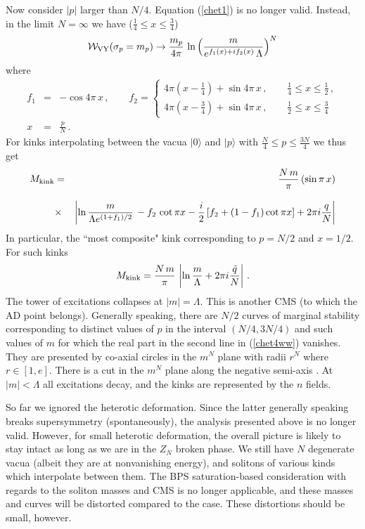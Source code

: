\documentclass[epsfig,12pt]{article}
\def\beq{\begin{equation}}
\def\eeq{\end{equation}}
\def\beqn{\begin{eqnarray}}
\def\eeqn{\end{eqnarray}}
\newcommand{\cw}{{\mathcal W}}
\begin{document}
Now consider $|p|$ larger than $N/4$. Equation (\ref{chet1}) is no longer valid. Instead, in the
limit $N=\infty$ we have ($\frac{1}{4}\leq x\leq \frac{3}{4}$)
\beq
\cw_{\rm VY}(\sigma_p=m_p)\to \frac{m_p}{4\pi}\,\ln\left(\frac{m}{e^{f_1(x)+i f_2(x)}\,\Lambda }\right)^N
\label{chet2}
\eeq
where
\beqn
f_1 
&=&
 -\cos 4\pi\,x\,,\qquad f_2 = \left\{\begin{array}{l}
4\pi\left(x-\frac{1}{4}\right) +\sin 4\pi\,x\,,\qquad \frac{1}{4}\leq x\leq \frac{1}{2}\,,\\[3mm]
4\pi\left(x-\frac{3}{4}\right) +\sin 4\pi\,x\,,\qquad \frac{1}{2}\leq x\leq \frac{3}{4}
\end{array}
\right.
\label{chet2w}
\\[3mm]
x
&=& \frac{p}{N}\,.
\label{chet2ww}
\eeqn 
For kinks interpolating between the  vacua $|0\rangle$ and  $|p\rangle$  with $\frac{N}{4}\leq p\leq \frac{3N}{4}$
we thus get
\beqn
M_{\rm kink} 
&=&
\frac{N\,m}{\pi}\left(\sin \pi\,x\right)
\nonumber\\[3mm]
&\times&
\left|
\ln\frac{m}{\Lambda e^{(1+f_1)/2}} \, - f_2\,\cot \pi x -\frac{i}{2}\left[f_2 +(1-f_1)\cot\pi x
\right]+2\pi i \frac{q}{N}
\right|
\nonumber\\
\label{chet4ww}
\eeqn
In particular, the
 ``most composite"  kink corresponding to $p=N/2$ and $x=1/2$.
For such kinks 
\beq
M_{\rm kink} 
=
\frac{N\,m}{\pi}\,\left|\ln\frac{m}{\Lambda} +2\pi i\frac{\tilde q}{N}
\right|\,.
\label{chet3}
\eeq
The tower of excitations collapses at $|m| = \Lambda$. This is another CMS (to which the AD point belongs).
Generally speaking, there are $N/2$ curves of marginal stability
corresponding to distinct values of $p$ in the interval $(N/4, 3N/4)$
and such values of $m$ for which the real part in the second line in (\ref{chet4ww}) vanishes.
They are presented by co-axial circles in the $m^N$ plane with radii $r^N$
where $r\in [1, e]$. There is a cut in the $m^N$ plane along the negative semi-axis \cite{Olmez}.
At $|m|<\Lambda$ all excitations decay, and the kinks are represented by the $n$ fields.

So far we ignored the heterotic deformation.
Since the latter generally speaking breaks 
supersymmetry (spontaneously), the analysis presented above is no longer valid.
However, for small heterotic deformation, the overall picture is likely to
stay intact as long as we are in the $Z_N$ broken phase. 
We still have $N$ degenerate vacua (albeit they are at nonvanishing energy),
and solitons of various kinds which interpolate between them.
The BPS saturation-based consideration with regards to
the soliton masses and  CMS is no longer applicable,
and these masses and  curves will be distorted compared to the \ntwot case.
These distortions should be small, however.
\end{document}
